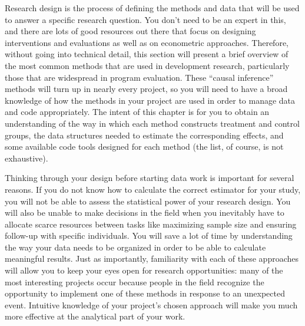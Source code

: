 
\begin{fullwidth}
Research design is the process of defining the methods and data
that will be used to answer a specific research question.
You don't need to be an expert in this,
and there are lots of good resources out there
that focus on designing interventions and evaluations
as well as on econometric approaches.
Therefore, without going into technical detail,
this section will present a brief overview
of the most common methods that are used in development research,
particularly those that are widespread in program evaluation.
These ``causal inference'' methods will turn up in nearly every project,
so you will need to have a broad knowledge of how the methods in your project
are used in order to manage data and code appropriately.
The intent of this chapter is for you to obtain an understanding of
the way in which each method constructs treatment and control groups,
the data structures needed to estimate the corresponding effects,
and some available code tools designed for each method (the list, of course, is not exhaustive).

Thinking through your design before starting data work is important for several reasons.
If you do not know how to calculate the correct estimator for your study,
you will not be able to assess the statistical power of your research design.
You will also be unable to make decisions in the field
when you inevitably have to allocate scarce resources
between tasks like maximizing sample size
and ensuring follow-up with specific individuals.
You will save a lot of time by understanding the way
your data needs to be organized
in order to be able to calculate meaningful results.
Just as importantly, familiarity with each of these approaches
will allow you to keep your eyes open for research opportunities:
many of the most interesting projects occur because people in the field
recognize the opportunity to implement one of these methods
in response to an unexpected event.
Intuitive knowledge of your project's chosen approach will make you
much more effective at the analytical part of your work.
\end{fullwidth}


